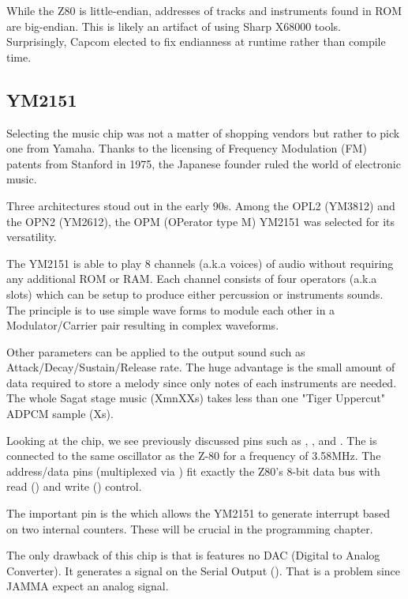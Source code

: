 \begin{trivia}
While the Z80 is little-endian, addresses of tracks and instruments found in ROM are big-endian. This is likely an artifact of using Sharp X68000 tools. Surprisingly, Capcom elected to fix endianness at runtime rather than compile time.
\end{trivia}

\subsection{YM2151}
Selecting the music chip was not a matter of shopping vendors but rather to pick one from Yamaha. Thanks to the licensing of Frequency Modulation (FM) patents from Stanford in 1975, the Japanese founder ruled the world of electronic music.

Three architectures stoud out in the early 90s. Among the OPL2 (YM3812) and the OPN2 (YM2612), the OPM (OPerator type M) YM2151 was selected for its versatility. 

The YM2151 is able to play 8 channels (a.k.a voices) of audio without requiring any additional ROM or RAM. Each channel consists of four operators (a.k.a slots) which can be setup to produce either percussion or instruments sounds. The principle is to use simple wave forms to module each other in a Modulator/Carrier pair resulting in complex waveforms\cite{fmProgramming}.


Other parameters can be applied to the output sound such as Attack/Decay/Sustain/Release rate. The huge advantage is the small amount of data required to store a melody since only notes of each instruments are needed. The whole Sagat stage music (XmnXXs) takes less than one "Tiger Uppercut" ADPCM sample (Xs).

Looking at the chip, we see previously discussed pins such as , , and . The  is connected to the same oscillator as the Z-80 for a frequency of 3.58MHz. The  address/data pins (multiplexed via ) fit exactly the Z80's 8-bit data bus with read () and write () control.

The important pin is the  which allows the YM2151 to generate interrupt based on two internal counters. These will be crucial in the programming chapter.


The only drawback of this chip is that is features no DAC (Digital to Analog Converter). It generates a signal on the Serial Output (). That is a problem since JAMMA expect an analog signal.

